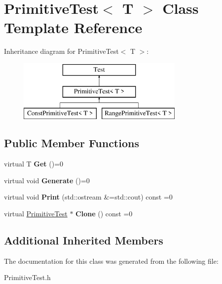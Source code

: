 \hypertarget{class_primitive_test}{}\section{Primitive\+Test$<$ T $>$ Class Template Reference}
\label{class_primitive_test}
Inheritance diagram for Primitive\+Test$<$ T $>$\+:\begin{figure}[H]
\begin{center}
\leavevmode
\includegraphics[height=3.000000cm]{class_primitive_test}
\end{center}
\end{figure}
\subsection*{Public Member Functions}
\begin{DoxyCompactItemize}
\item 
\mbox{\label{class_primitive_test_a330ccae6cebf4cd196a1087838b3bb3f}} 
virtual T {\bfseries Get} ()=0
\item 
\mbox{\label{class_primitive_test_a83aa7e6514500d5a470d9a437088bb1d}} 
virtual void {\bfseries Generate} ()=0
\item 
\mbox{\label{class_primitive_test_a7f510e857162432281fa6fed458bfd5f}} 
virtual void {\bfseries Print} (std\+::ostream \&=std\+::cout) const =0
\item 
\mbox{\label{class_primitive_test_ac4efd25f85ac1c6d50c7e7b9c3b6e86e}} 
virtual \hyperlink{class_primitive_test}{Primitive\+Test} $\ast$ {\bfseries Clone} () const =0
\end{DoxyCompactItemize}
\subsection*{Additional Inherited Members}


The documentation for this class was generated from the following file\+:\begin{DoxyCompactItemize}
\item 
Primitive\+Test.\+h\end{DoxyCompactItemize}
